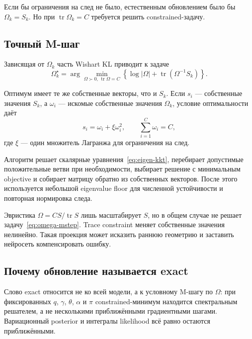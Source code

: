 \documentclass[12pt,a4paper]{article}
\DeclareMathOperator{\tr}{tr}
\newenvironment{warningbox}{\par\medskip\noindent{\color{red}\bfseries Важно не перепутать. }\ignorespaces}{\par\medskip}
\begin{document}
Если бы ограничения на след не было, естественным обновлением было бы \(\Omega_k=S_k\). Но при \(\tr\Omega_k=C\) требуется решить constrained-задачу.

\subsection{Точный M-шаг}

Зависящая от \(\Omega_k\) часть Wishart KL приводит к задаче
\begin{equation}
\Omega_k^{\star}=\arg\min_{\Omega\succ0,\,\tr\Omega=C}\left\{\log|\Omega|+\tr(\Omega^{-1}S_k)\right\}.
\label{eq:omega-mstep}
\end{equation}

Оптимум имеет те же собственные векторы, что и \(S_k\). Если \(s_i\) --- собственные значения \(S_k\), а \(\omega_i\) --- искомые собственные значения \(\Omega_k\), условие оптимальности даёт
\begin{equation}
s_i=\omega_i+\xi\omega_i^2,\qquad \sum_{i=1}^{C}\omega_i=C,
\label{eq:eigen-kkt}
\end{equation}
где \(\xi\) --- один множитель Лагранжа для ограничения на след.

Алгоритм решает скалярные уравнения~\eqref{eq:eigen-kkt}, перебирает допустимые положительные ветви при необходимости, выбирает решение с минимальным objective и собирает матрицу обратно из собственных векторов. После этого используется небольшой eigenvalue floor для численной устойчивости и повторная нормировка следа.

\begin{warningbox}
Эвристика \(\Omega=CS/\tr S\) лишь масштабирует \(S\), но в общем случае не решает задачу~\eqref{eq:omega-mstep}. Trace constraint меняет собственные значения нелинейно. Такая проекция может исказить раннюю геометрию и заставить нейросеть компенсировать ошибку.
\end{warningbox}

\subsection{Почему обновление называется exact}

Слово exact относится не ко всей модели, а к условному M-шагу по \(\Omega\): при фиксированных \(q\), \(\gamma\), \(\theta\), \(\alpha\) и \(\pi\) constrained-минимум находится спектральным решателем, а не несколькими приближёнными градиентными шагами. Вариационный posterior и интегралы likelihood всё равно остаются приближёнными.
\end{document}
